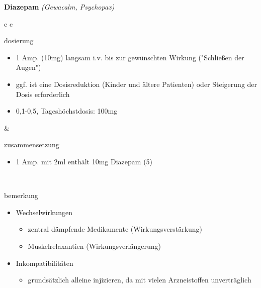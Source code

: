 \begin{frame}{
    \textbf{Diazepam}
    \textit{(Gewacalm, Psychopax)}
}
    \begin{tabular}{c c}
        \begin{beamercolorbox}[wd=\boxwidth\textwidth,ht=\boxheight\textheight,sep=1em]{dosierung}
            \scriptsize
            \begin{itemize}
                \item 1 Amp. (10mg) langsam i.v. bis zur gewünschten Wirkung ("Schließen der Augen")
                \item ggf. ist eine Dosisreduktion (Kinder und ältere Patienten) oder Steigerung der Dosis erforderlich
                \item 0,1-0,5\mgkgkg, Tageshöchstdosis: 100mg
            \end{itemize}
        \end{beamercolorbox} & 
        \begin{beamercolorbox}[wd=\boxwidth\textwidth,ht=\boxheight\textheight,sep=1em]{zusammensetzung}
            \begin{itemize}
                \item 1 Amp. mit 2ml enthält 10mg Diazepam (5\mgml)
            \end{itemize}
        \end{beamercolorbox} \\
        \begin{beamercolorbox}[wd=\textwidth,ht=\boxheight\textheight,sep=1em]{bemerkung}
            \begin{itemize}
                \scriptsize
                \item {
                    Wechselwirkungen
                    \begin{itemize}
                        \scriptsize
                        \item zentral dämpfende Medikamente (Wirkungsverstärkung)
                        \item Muskelrelaxantien (Wirkungsverlängerung)
                    \end{itemize}
                }
                \item {
                    Inkompatibilitäten
                    \begin{itemize}
                        \scriptsize
                        \item grundsätzlich alleine injizieren, da mit vielen Arzneistoffen unverträglich
                    \end{itemize}
                }
            \end{itemize}
        \end{beamercolorbox} \\
    \end{tabular}
\end{frame}

